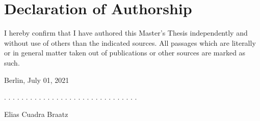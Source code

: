 \documentclass[a4paper,11pt]{article}
\newcommand{\thesistype}{Master's Thesis}
\newcommand{\thesisauthor}{Elias Cuadra Braatz}
\newcommand{\thesisdate}{July 01, 2021}
\begin{document}

\newpage
\thispagestyle{empty}
\hypertarget{declaration-of-authorship}{%
\section*{Declaration of Authorship}\label{declaration-of-authorship}}

I hereby confirm that I have authored this \thesistype{} independently and
without use of others than the indicated sources. All passages which are
literally or in general matter taken out of publications or other sources are
marked as such.
\vspace{1cm}

Berlin, \thesisdate{}
\vspace{3cm}

. . . . . . . . . . . . . . . . . . . . . . . . . . . . . . .
\vspace{0.1cm}

\thesisauthor{}
\end{document}
